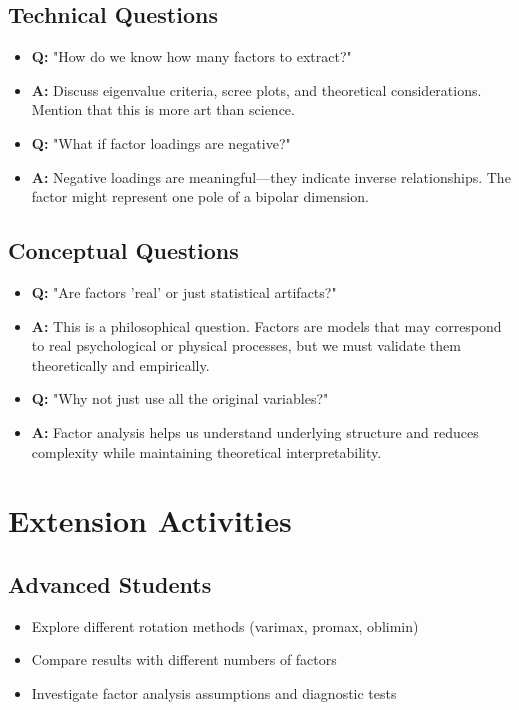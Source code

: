 \documentclass[11pt,a4paper]{article}
\begin{document}
\subsection{Technical Questions}
\begin{itemize}
    \item \textbf{Q:} "How do we know how many factors to extract?"
    \item \textbf{A:} Discuss eigenvalue criteria, scree plots, and theoretical considerations. Mention that this is more art than science.
    
    \item \textbf{Q:} "What if factor loadings are negative?"
    \item \textbf{A:} Negative loadings are meaningful—they indicate inverse relationships. The factor might represent one pole of a bipolar dimension.
\end{itemize}

\subsection{Conceptual Questions}
\begin{itemize}
    \item \textbf{Q:} "Are factors 'real' or just statistical artifacts?"
    \item \textbf{A:} This is a philosophical question. Factors are models that may correspond to real psychological or physical processes, but we must validate them theoretically and empirically.
    
    \item \textbf{Q:} "Why not just use all the original variables?"
    \item \textbf{A:} Factor analysis helps us understand underlying structure and reduces complexity while maintaining theoretical interpretability.
\end{itemize}

\section{Extension Activities}

\subsection{Advanced Students}
\begin{itemize}
    \item Explore different rotation methods (varimax, promax, oblimin)
    \item Compare results with different numbers of factors
    \item Investigate factor analysis assumptions and diagnostic tests
\end{itemize}
\end{document}
